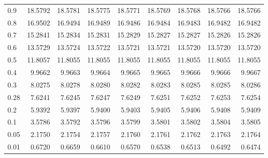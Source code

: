 \begin{landscape}
\begin{table}
\begin{center}
\begin{tabular}{l|rrrrrrrr}
0.9 & 18.5792 & 18.5781 & 18.5775 & 18.5771 & 18.5769 & 18.5768  & 18.5766 & 18.5766 \\ 
0.8 & 16.9502 & 16.9494 & 16.9489 & 16.9486 & 16.9484 & 16.9483  & 16.9482 & 16.9482 \\ 
0.7 & 15.2841 & 15.2834 & 15.2831 & 15.2829 & 15.2827 & 15.2827  & 15.2826 & 15.2826 \\ 
0.6 & 13.5729 & 13.5724 & 13.5722 & 13.5721 & 13.5721 & 13.5720  & 13.5720 & 13.5720 \\ 
0.5 & 11.8057 & 11.8055 & 11.8055 & 11.8055 & 11.8055 & 11.8055  & 11.8055 & 11.8055 \\ 
0.4 &  9.9662 &  9.9663 &  9.9664 &  9.9665 &  9.9665 &  9.9666  &  9.9666 &  9.9667 \\ 
0.3 &  8.0275 &  8.0278 &  8.0280 &  8.0282 &  8.0283 &  8.0285  &  8.0285 &  8.0286 \\ 
0.28 & 7.6241 &  7.6245 &  7.6247 &  7.6249 &  7.6251 &  7.6252  &  7.6253 &  7.6254 \\ 
0.2 &  5.9392 &  5.9397 &  5.9400 &  5.9403 &  5.9405 &  5.9406  &  5.9408 &  5.9409 \\ 
0.1 &  3.5786 &  3.5792 &  3.5796 &  3.5799 &  3.5801 &  3.5802  &  3.5804 &  3.5805 \\ 
0.05 & 2.1750 &  2.1754 &  2.1757 &  2.1760 &  2.1761 &  2.1762  &  2.1763 &  2.1764 \\ 
0.01 & 0.6720 &  0.6659 &  0.6610 &  0.6570 &  0.6538 &  0.6513  &  0.6492 &  0.6474 \\ 
\hline \hline
\end{tabular}
\end{center}
\end{table}
\end{landscape}

 


